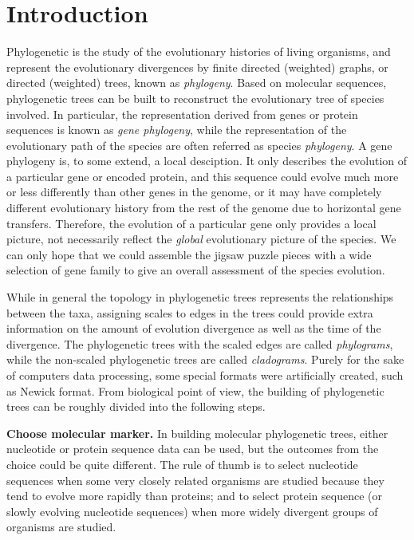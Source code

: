\chapter*{Introduction}
\begin{quote}
\end{quote}

Phylogenetic is the study of the evolutionary histories of living 
organisms, and represent the evolutionary divergences by finite 
directed (weighted) graphs, or directed (weighted) trees, known 
as \textit{phylogeny}. Based on molecular sequences, phylogenetic trees 
can be built to reconstruct the evolutionary tree of species involved. 
In particular, the representation derived from genes or protein 
sequences is known as \textit{gene phylogeny}, while the representation 
of the evolutionary path of the species are often referred as 
species \textit{phylogeny}. A gene phylogeny is, to some extend, a local desciption. 
It only describes the evolution of a particular gene or encoded protein, 
and this sequence could evolve much more or less differently than 
other genes in the genome, or it may have completely different 
evolutionary history from the rest of the genome due to horizontal 
gene transfers. Therefore, the evolution of a particular gene only 
provides a local picture, not necessarily reflect the \textit{global} 
evolutionary picture of the species. We can only hope that we could 
assemble the jigsaw puzzle pieces with a wide selection of gene 
family to give an overall assessment of the species evolution. 

While in general the topology in phylogenetic trees represents 
the relationships between the taxa, assigning scales to edges 
in the trees could provide extra information on the amount of 
evolution divergence as well as the time of the divergence. 
The phylogenetic trees with the scaled edges are called \textit{phylograms}, 
while the non-scaled phylogenetic trees are called \textit{cladograms}. 
Purely for the sake of computers data processing, some special 
formats were artificially created, such as Newick format. From 
biological point of view, the building of phylogenetic trees 
can be roughly divided into the following steps. 


\textbf{Choose molecular marker.}
In building molecular phylogenetic trees, either nucleotide 
or protein sequence data can be used, but the outcomes from 
the choice could be quite different. The rule of thumb is to 
select nucleotide sequences when some very closely related 
organisms are studied because they tend to evolve more rapidly 
than proteins; and to select protein sequence (or slowly evolving 
nucleotide sequences) when more widely divergent groups of 
organisms are studied.



